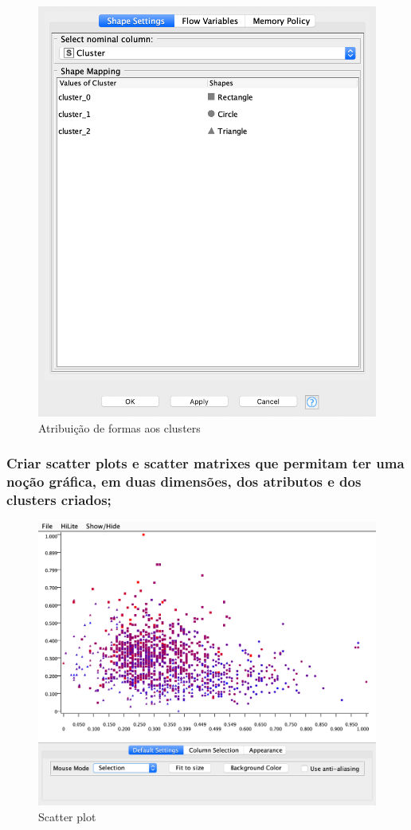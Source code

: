 \documentclass{article}
\begin{document}
\begin{figure}[H]
    \centering
    \includegraphics[scale=0.3]{Images/T4_b2.png}
    \caption{Atribuição de formas aos clusters}
\end{figure}

\subsubsection{Criar scatter plots e scatter matrixes que permitam ter uma noção gráfica, em duas dimensões, dos atributos e dos clusters criados;}

\begin{figure}[H]
    \centering
    \includegraphics[scale=0.3]{Images/T4_c1.png}
    \caption{Scatter plot}
\end{figure}
\end{document}
